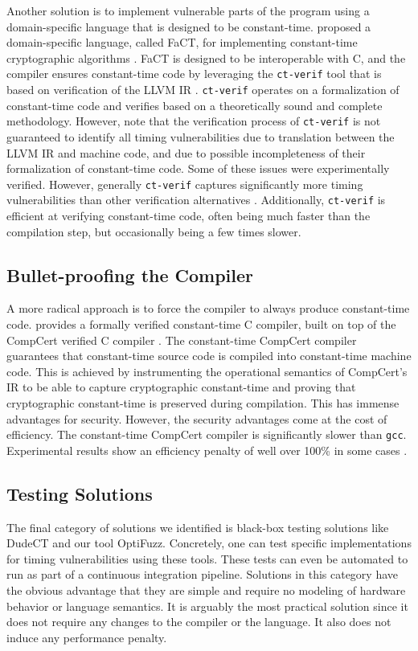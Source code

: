 Another solution is to implement vulnerable parts of the program using a domain-specific language that is designed to be constant-time.
\citeauthor{fact} proposed a domain-specific language, called FaCT, for implementing constant-time cryptographic algorithms \citep{fact}.
FaCT is designed to be interoperable with C, and the compiler ensures constant-time code by leveraging the \texttt{ct-verif} tool that is based on verification of the LLVM IR \cite{verifying-constant-time-llvm}.
\texttt{ct-verif} operates on a formalization of constant-time code and verifies based on a theoretically sound and complete methodology.
However, \citeauthor{verifying-constant-time-llvm} note that the verification process of \texttt{ct-verif} is not guaranteed to identify all timing vulnerabilities due to translation between the LLVM IR and machine code, and due to possible incompleteness of their formalization of constant-time code. 
Some of these issues were experimentally verified.
However, generally \texttt{ct-verif} captures significantly more timing vulnerabilities than other verification alternatives \citep{verifying-constant-time-llvm}.
Additionally, \texttt{ct-verif} is efficient at verifying constant-time code, often being much faster than the compilation step, but occasionally being a few times slower.

\subsection{Bullet-proofing the Compiler}
A more radical approach is to force the compiler to always produce constant-time code.
\citeauthor{verified-constant-time-c-comiler} provides a formally verified constant-time C compiler, built on top of the CompCert verified C compiler \citep{verified-constant-time-c-comiler}. 
The constant-time CompCert compiler guarantees that constant-time source code is compiled into constant-time machine code.
This is achieved by instrumenting the operational semantics of CompCert's IR to be able to capture cryptographic constant-time and proving that cryptographic constant-time is preserved during compilation. 
This has immense advantages for security.
However, the security advantages come at the cost of efficiency. 
The constant-time CompCert compiler is significantly slower than \texttt{gcc}.
Experimental results show an efficiency penalty of well over 100\% in some cases \citep{verified-constant-time-c-comiler}.

\subsection{Testing Solutions}
The final category of solutions we identified is black-box testing solutions like DudeCT \citep{dudect} and our tool OptiFuzz.
Concretely, one can test specific implementations for timing vulnerabilities using these tools.
These tests can even be automated to run as part of a continuous integration pipeline.
Solutions in this category have the obvious advantage that they are simple and require no modeling of hardware behavior or language semantics.
It is arguably the most practical solution since it does not require any changes to the compiler or the language.
It also does not induce any performance penalty.

